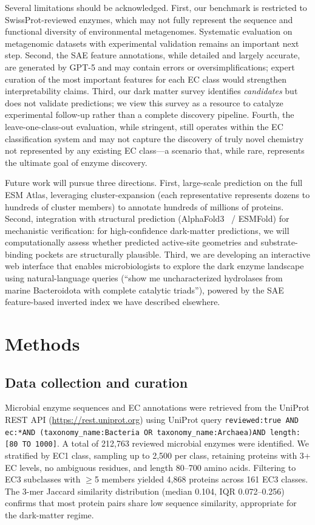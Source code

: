 \documentclass[12pt,a4paper]{article}
\begin{document}
Several limitations should be acknowledged. First, our benchmark is restricted to SwissProt-reviewed enzymes, which may not fully represent the sequence and functional diversity of environmental metagenomes. Systematic evaluation on metagenomic datasets with experimental validation remains an important next step. Second, the SAE feature annotations, while detailed and largely accurate, are generated by GPT-5 and may contain errors or oversimplifications; expert curation of the most important features for each EC class would strengthen interpretability claims. Third, our dark matter survey identifies \textit{candidates} but does not validate predictions; we view this survey as a resource to catalyze experimental follow-up rather than a complete discovery pipeline. Fourth, the leave-one-class-out evaluation, while stringent, still operates within the EC classification system and may not capture the discovery of truly novel chemistry not represented by any existing EC class---a scenario that, while rare, represents the ultimate goal of enzyme discovery.

Future work will pursue three directions. First, large-scale prediction on the full ESM Atlas, leveraging cluster-expansion (each representative represents dozens to hundreds of cluster members) to annotate hundreds of millions of proteins. Second, integration with structural prediction (AlphaFold3~\cite{jumper2021highly} / ESMFold) for mechanistic verification: for high-confidence dark-matter predictions, we will computationally assess whether predicted active-site geometries and substrate-binding pockets are structurally plausible. Third, we are developing an interactive web interface that enables microbiologists to explore the dark enzyme landscape using natural-language queries (``show me uncharacterized hydrolases from marine Bacteroidota with complete catalytic triads''), powered by the SAE feature-based inverted index we have described elsewhere.

\section{Methods}

\subsection{Data collection and curation}

Microbial enzyme sequences and EC annotations were retrieved from the UniProt REST API (\url{https://rest.uniprot.org}) using UniProt query \texttt{reviewed:true AND ec:*}\linebreak\texttt{AND (taxonomy\_name:Bacteria OR taxonomy\_name:Archaea)}\linebreak\texttt{AND length:[80 TO 1000]}. A total of 212,763 reviewed microbial enzymes were identified. We stratified by EC1 class, sampling up to 2,500 per class, retaining proteins with 3+ EC levels, no ambiguous residues, and length 80--700 amino acids. Filtering to EC3 subclasses with $\ge$5 members yielded 4,868 proteins across 161 EC3 classes. The 3-mer Jaccard similarity distribution (median 0.104, IQR 0.072--0.256) confirms that most protein pairs share low sequence similarity, appropriate for the dark-matter regime.
\end{document}
